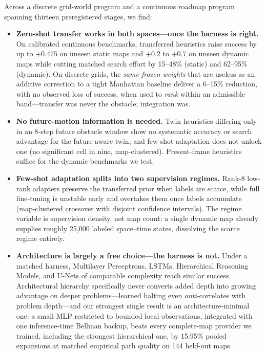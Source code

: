 \documentclass[letterpaper]{article} %
\begin{document}
Across a discrete grid-world program and a continuous roadmap program \citep{kavraki1996prm} spanning thirteen preregistered stages, we find:
\begin{itemize}
    \item \textbf{Zero-shot transfer works in both spaces---once the harness is right.} On calibrated continuous benchmarks, transferred heuristics raise success by up to $+0.475$ on unseen static maps and $+0.2$ to $+0.7$ on unseen dynamic maps while cutting matched search effort by 15--48\% (static) and 62--95\% (dynamic). On discrete grids, the \emph{same frozen weights} that are useless as an additive correction to a tight Manhattan baseline deliver a 6--15\% reduction, with no observed loss of success, when used to \emph{rank} within an admissible band---transfer was never the obstacle; integration was.
    \item \textbf{No future-motion information is needed.} Twin heuristics differing only in an 8-step future obstacle window show no systematic accuracy or search advantage for the future-aware twin, and few-shot adaptation does not unlock one (no significant cell in nine, map-clustered). Present-frame heuristics suffice for the dynamic benchmarks we test.
    \item \textbf{Few-shot adaptation splits into two supervision regimes.} Rank-8 low-rank adapters preserve the transferred prior when labels are scarce, while full fine-tuning is unstable early and overtakes them once labels accumulate (map-clustered crossover with disjoint confidence intervals). The regime variable is supervision density, not map count: a single dynamic map already supplies roughly 25{,}000 labeled space--time states, dissolving the scarce regime entirely.
    \item \textbf{Architecture is largely a free choice---the harness is not.} Under a matched harness, Multilayer Perceptrons, LSTMs, Hierarchical Reasoning Models, and U-Nets of comparable complexity reach similar success. Architectural hierarchy specifically never converts added depth into growing advantage on deeper problems---learned halting even \emph{anti-}correlates with problem depth---and our strongest single result is an architecture-minimal one: a small MLP restricted to bounded local observations, integrated with one inference-time Bellman backup, beats every complete-map provider we trained, including the strongest hierarchical one, by 15.95\% pooled expansions at matched empirical path quality on 144 held-out maps.
\end{itemize}
\end{document}
